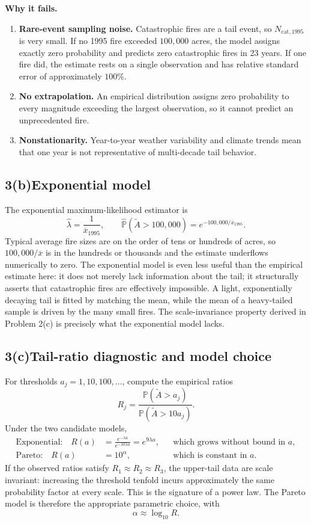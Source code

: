 \documentclass[11pt,letterpaper]{article}
\newcommand{\problemPart}[2]{\subsection*{#1\quad #2}}
\newcommand{\Prob}{\mathbb{P}}
\newcommand{\lambdahat}{\widehat\lambda}
\begin{document}
\textbf{Why it fails.}
\begin{enumerate}[label=(\roman*),leftmargin=2em,itemsep=3pt,topsep=2pt]
\item \textbf{Rare-event sampling noise.} Catastrophic fires are a tail event, so $N_{\mathrm{cat},1995}$ is very small. If no 1995 fire exceeded $100{,}000$ acres, the model assigns exactly zero probability and predicts zero catastrophic fires in 23 years. If one fire did, the estimate rests on a single observation and has relative standard error of approximately $100\%$.
\item \textbf{No extrapolation.} An empirical distribution assigns zero probability to every magnitude exceeding the largest observation, so it cannot predict an unprecedented fire.
\item \textbf{Nonstationarity.} Year-to-year weather variability and climate trends mean that one year is not representative of multi-decade tail behavior.
\end{enumerate}

\problemPart{3(b)}{Exponential model}

The exponential maximum-likelihood estimator is
\[
  \lambdahat=\frac{1}{\overline x_{1995}},
  \qquad
  \widehat{\Prob}(\widetilde A>100{,}000)
  =e^{-100{,}000/\overline x_{1995}}.
\]
Typical average fire sizes are on the order of tens or hundreds of acres, so $100{,}000/\overline x$ is in the hundreds or thousands and the estimate underflows numerically to zero. The exponential model is even less useful than the empirical estimate here: it does not merely lack information about the tail; it structurally asserts that catastrophic fires are effectively impossible. A light, exponentially decaying tail is fitted by matching the mean, while the mean of a heavy-tailed sample is driven by the many small fires. The scale-invariance property derived in Problem 2(c) is precisely what the exponential model lacks.

\problemPart{3(c)}{Tail-ratio diagnostic and model choice}

For thresholds $a_j=1,10,100,\ldots$, compute the empirical ratios
\[
  R_j=\frac{\Prob(\widetilde A>a_j)}{\Prob(\widetilde A>10a_j)}.
\]
Under the two candidate models,
\begin{align*}
\text{Exponential:}\quad
R(a)&=\frac{e^{-\lambda a}}{e^{-10\lambda a}}
     =e^{9\lambda a},
     &&\text{which grows without bound in }a,\\
\text{Pareto:}\quad
R(a)&=10^\alpha,
     &&\text{which is constant in }a.
\end{align*}
If the observed ratios satisfy $R_1\approx R_2\approx R_3$, the upper-tail data are scale invariant: increasing the threshold tenfold incurs approximately the same probability factor at every scale. This is the signature of a power law. The Pareto model is therefore the appropriate parametric choice, with
\[
  \alpha\approx\log_{10}R.
\]
\end{document}
